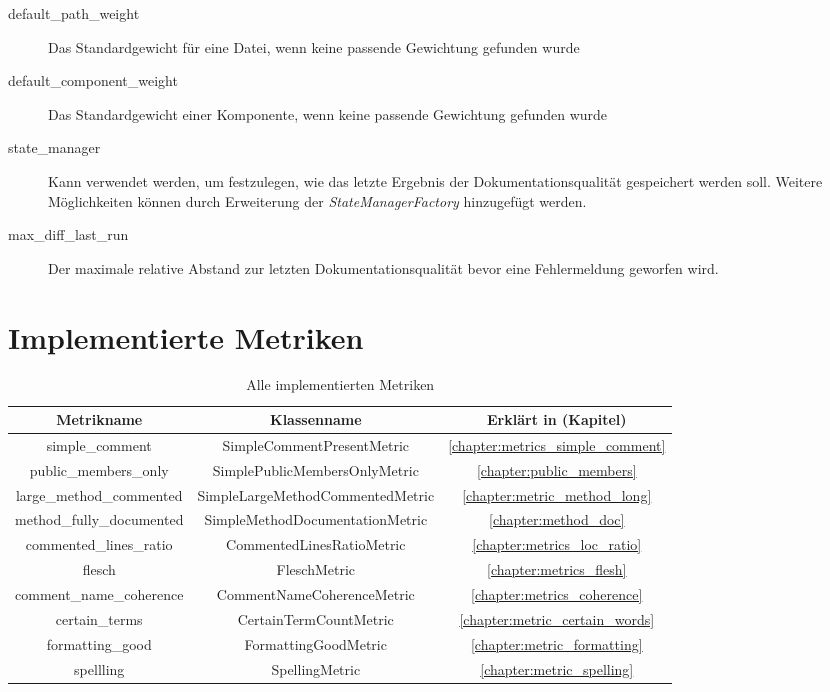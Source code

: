 \begin{appendices}
\begin{description}
         \item[default\_path\_weight] Das Standardgewicht für eine Datei, wenn keine passende Gewichtung gefunden wurde
         
         \item[default\_component\_weight] Das Standardgewicht einer Komponente, wenn keine passende Gewichtung gefunden wurde
         
         \item[state\_manager] Kann verwendet werden, um festzulegen, wie das letzte Ergebnis der Dokumentationsqualität gespeichert werden soll. Weitere Möglichkeiten können durch Erweiterung der \textit{StateManagerFactory} hinzugefügt werden.
         
         \item[max\_diff\_last\_run] Der maximale  relative Abstand zur letzten Dokumentationsqualität bevor eine Fehlermeldung geworfen wird.
        
        
        
    \label{enum:tool_javadoc_conf}
\end{description}
\chapter{Implementierte Metriken}
\begin{table}[]
    \centering
    \begin{tabular}{c|c|c}
        Metrikname & Klassenname & Erklärt in (Kapitel)  \\\hline
          simple\_comment & SimpleCommentPresentMetric & \ref{chapter:metrics_simple_comment}\\\hline
        public\_members\_only & SimplePublicMembersOnlyMetric &  \ref{chapter:public_members}\\\hline
        large\_method\_commented & SimpleLargeMethodCommentedMetric & \ref{chapter:metric_method_long}\\\hline
     method\_fully\_documented & SimpleMethodDocumentationMetric & \ref{chapter:method_doc}\\\hline
       commented\_lines\_ratio& CommentedLinesRatioMetric & \ref{chapter:metrics_loc_ratio}\\\hline
       flesch& FleschMetric & \ref{chapter:metrics_flesh}\\\hline
        comment\_name\_coherence&CommentNameCoherenceMetric & \ref{chapter:metrics_coherence}\\\hline
     certain\_terms&CertainTermCountMetric & \ref{chapter:metric_certain_words}\\\hline
          formatting\_good&FormattingGoodMetric & \ref{chapter:metric_formatting}\\\hline
          spellling&SpellingMetric & \ref{chapter:metric_spelling}\\\hline
    \end{tabular}
    \caption{Alle implementierten Metriken}
    \label{table:metrics_name}
\end{table}

\end{appendices}
	
